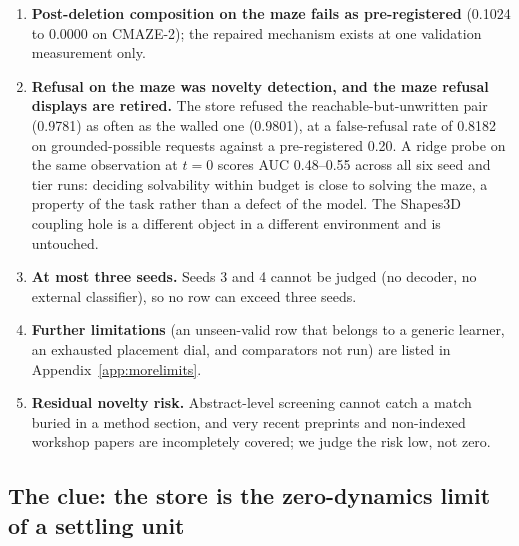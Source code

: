 \documentclass{article} %
\begin{document}
\begin{enumerate}[leftmargin=*,itemsep=1pt]
  store fired the pre-declared falsifier on row 3 (\S\ref{sec:bard}). %
\item \textbf{Post-deletion composition on the maze fails as pre-registered} (0.1024 to 0.0000
  on CMAZE-2); the repaired mechanism exists at one validation measurement only.
\item \textbf{Refusal on the maze was novelty detection, and the maze refusal displays are
  retired.} The store refused the reachable-but-unwritten pair (0.9781) as often as the walled
  one (0.9801), at a false-refusal rate of 0.8182 on grounded-possible requests against a
  pre-registered 0.20. %
  A ridge probe on the same observation at $t=0$ scores AUC 0.48--0.55 across all six seed and
  tier runs: deciding solvability within budget is close to solving the maze, a property of the
  task rather than a defect of the model. %
  The Shapes3D coupling hole is a different object in a different environment and is untouched.
\item \textbf{At most three seeds.} Seeds 3 and 4 cannot be judged (no decoder, no external
  classifier), so no row can exceed three seeds.
\item \textbf{Further limitations} (an unseen-valid row that belongs to a generic learner, an
  exhausted placement dial, and comparators not run) are listed in Appendix~\ref{app:morelimits}.
\item \textbf{Residual novelty risk.} Abstract-level screening cannot catch a match buried in a
  method section, and very recent preprints and non-indexed workshop papers are incompletely
  covered; we judge the risk low, not zero. %
\end{enumerate}

\subsection{The clue: the store is the zero-dynamics limit of a settling unit}
\label{sec:clue}
\end{document}
